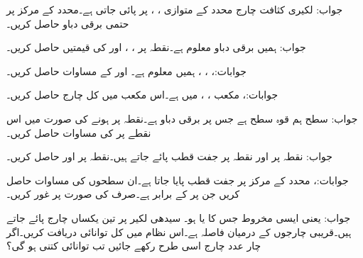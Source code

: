 جواب:
لکیری کثافت چارج  محدد  کے متوازی ، ،  پر پائی جاتی ہے۔محدد کے مرکز پر حتمی برقی دباو حاصل کریں۔

جواب:
ہمیں برقی دباو  معلوم ہے۔نقطہ  پر ، ،  اور  کی قیمتیں حاصل کریں۔

جوابات:، ،
 ، 
ہمیں  معلوم ہے۔ اور  کے مساوات حاصل کریں۔

جوابات:، 
مکعب ، ،  میں  ہے۔اس مکعب میں کل چارج حاصل کریں۔

جواب:
سطح  ہم قوہ سطح ہے جس پر برقی دباو  ہے۔نقطہ  پر  ہونے کی صورت میں اس نقطے پر  کی مساوات حاصل کریں۔

جواب: 
نقطہ  پر  اور نقطہ  پر  جفت قطب پائے جاتے ہیں۔نقطہ  پر  اور  حاصل کریں۔

جوابات:، 
محدد کے مرکز پر  جفت قطب پایا جاتا ہے۔ان سطحوں کی مساوات حاصل کریں جن پر  کے برابر ہے۔صرف  کی صورت پر غور کریں۔

جواب: یعنی ایسی مخروط جس کا  یا  ہو۔ 
سیدھی لکیر پر تین یکساں چارج  پائے جاتے ہیں۔قریبی چارجوں کے درمیان فاصلہ  ہے۔اس نظام میں کل توانائی دریافت کریں۔اگر چار عدد چارج اسی طرح رکھے جائیں تب توانائی کتنی ہو گی؟

